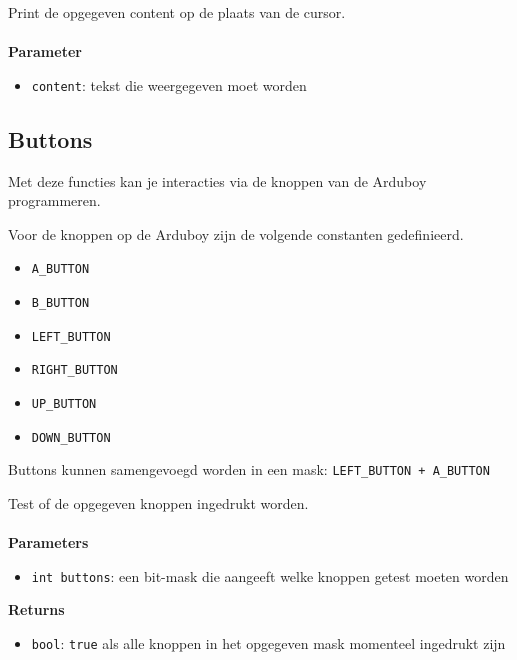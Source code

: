\documentclass[11pt,fleqn]{book} %
\begin{document}
\begin{libf}
	Print de opgegeven content op de plaats van de cursor.\\ \\
	\textbf{Parameter}
	\begin{itemize}
		\item \texttt{content}: tekst die weergegeven moet worden
	\end{itemize}
\end{libf}

\subsection{Buttons}
Met deze functies kan je interacties via de knoppen van de Arduboy programmeren.

\begin{libf}
	Voor de knoppen op de Arduboy zijn de volgende constanten gedefinieerd.
	\begin{multicols}{3}
		\begin{itemize}
			\item \texttt{A\_BUTTON}
			\item \texttt{B\_BUTTON}
			\item \texttt{LEFT\_BUTTON}
			\item \texttt{RIGHT\_BUTTON}
			\item \texttt{UP\_BUTTON}
			\item \texttt{DOWN\_BUTTON}
		\end{itemize}
	\end{multicols}
	
	Buttons kunnen samengevoegd worden in een mask: \texttt{LEFT\_BUTTON + A\_BUTTON}
\end{libf}

\begin{libf}
	Test of de opgegeven knoppen ingedrukt worden.\\ \\
	\textbf{Parameters}
	\begin{itemize}
		\item \texttt{int buttons}: een bit-mask die aangeeft welke knoppen getest moeten worden 
	\end{itemize}
	\textbf{Returns}
	\begin{itemize}
		\item \texttt{bool}: \texttt{true} als alle knoppen in het opgegeven mask momenteel ingedrukt zijn
	\end{itemize}
\end{libf}
\end{document}
